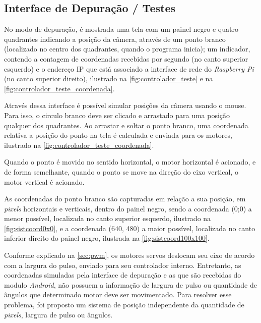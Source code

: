 \subsection{Interface de Depuração / Testes}
\label{subsec:iterfacedepuracao}

No modo de depuração, é mostrada uma tela com um painel negro e quatro quadrantes indicando a posição da câmera, através de um ponto branco (localizado no centro dos quadrantes, quando o programa inicia); um indicador, contendo a contagem de coordenadas recebidas por segundo (no canto superior esquerdo) e o endereço IP que está associado a interface de rede do \textit{Raspberry Pi} (no canto superior direito), ilustrado na \autoref{fig:controlador_teste} e na \autoref{fig:controlador_teste_coordenada}. \par

Através dessa interface é possível simular posições da câmera usando o mouse. Para isso, o circulo branco deve ser clicado e arrastado para uma posição qualquer dos quadrantes. Ao arrastar e soltar o ponto branco, uma coordenada relativa a posição do ponto na tela é calculada e enviada para os motores, ilustrado na \autoref{fig:controlador_teste_coordenada}.\par

Quando o ponto é movido no sentido horizontal, o motor horizontal é acionado, e de forma semelhante, quando o ponto se move na direção do eixo vertical, o motor vertical é acionado.\par

As coordenadas do ponto branco são capturadas em relação a sua posição, em \textit{pixels} horizontais e verticais, dentro do painel negro, sendo a coordenada (0;0) a menor possível, localizada no canto superior esquerdo, ilustrado na \autoref{fig:sistcoord0x0}, e a coordenada (640, 480) a maior possível, localizada no canto inferior direito do painel negro, ilustrada na \autoref{fig:sistcoord100x100}.\par

Conforme explicado na \autoref{sec:pwm}, os motores servos deslocam seu eixo de acordo com a largura do pulso, enviado para seu controlador interno. Entretanto, as coordenadas simuladas pela interface de depuração e as que são recebidas do modulo \textit{Android}, não possuem a informação de largura de pulso ou quantidade de ângulos que determinado motor deve ser movimentado. Para resolver esse problema, foi proposto um sistema de posição independente da quantidade de \textit{pixels}, largura de pulso ou ângulos.\par


